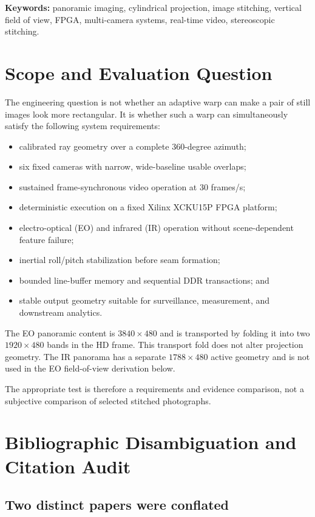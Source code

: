 \documentclass[10pt]{article}
\begin{document}
\textbf{Keywords:} panoramic imaging, cylindrical projection, image stitching, vertical field of view, FPGA, multi-camera systems, real-time video, stereoscopic stitching.

\section{Scope and Evaluation Question}

The engineering question is not whether an adaptive warp can make a pair of still images look more rectangular. It is whether such a warp can simultaneously satisfy the following system requirements:

\begin{itemize}
  \item calibrated ray geometry over a complete 360-degree azimuth;
  \item six fixed cameras with narrow, wide-baseline usable overlaps;
  \item sustained frame-synchronous video operation at 30 frames/s;
  \item deterministic execution on a fixed Xilinx XCKU15P FPGA platform;
  \item electro-optical (EO) and infrared (IR) operation without scene-dependent feature failure;
  \item inertial roll/pitch stabilization before seam formation;
  \item bounded line-buffer memory and sequential DDR transactions; and
  \item stable output geometry suitable for surveillance, measurement, and downstream analytics.
\end{itemize}

The EO panoramic content is $3840\times480$ and is transported by folding it into two $1920\times480$ bands in the HD frame. This transport fold does not alter projection geometry. The IR panorama has a separate $1788\times480$ active geometry and is not used in the EO field-of-view derivation below.

The appropriate test is therefore a requirements and evidence comparison, not a subjective comparison of selected stitched photographs.

\section{Bibliographic Disambiguation and Citation Audit}

\subsection{Two distinct papers were conflated}
\end{document}

